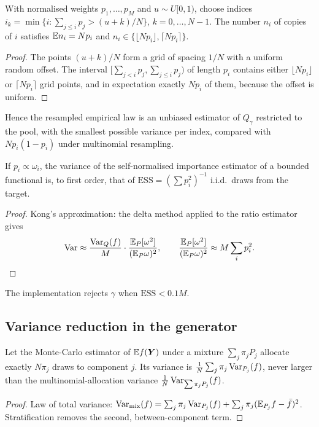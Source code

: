 \begin{proposition}
With normalised weights $p_1,\dots,p_M$ and $u\sim U[0,1)$, choose indices $i_k=\min\{i:\sum_{j\le i}p_j>(u+k)/N\}$, $k=0,\dots,N-1$. The number
$n_i$ of copies of $i$ satisfies $\mathbb{E} n_i=Np_i$ and $n_i\in\{\lfloor Np_i\rfloor,\lceil Np_i\rceil\}$.
\end{proposition}
\begin{proof}
The points $(u+k)/N$ form a grid of spacing $1/N$ with a uniform random offset. The interval $[\sum_{j<i}p_j,\sum_{j\le i}p_j)$ of length $p_i$
contains either $\lfloor Np_i\rfloor$ or $\lceil Np_i\rceil$ grid points, and in expectation exactly $Np_i$ of them, because the offset is uniform.
\end{proof}
Hence the resampled empirical law is an unbiased estimator of $Q_\gamma$ restricted to the pool, with the smallest possible variance per index,
compared with $Np_i(1-p_i)$ under multinomial resampling.

\begin{proposition}
If $p_i\propto\omega_i$, the variance of the self-normalised importance estimator of a bounded functional is, to first order, that of
$\mathrm{ESS}=(\sum p_i^2)^{-1}$ i.i.d.\ draws from the target.
\end{proposition}
\begin{proof}
Kong's approximation: the delta method applied to the ratio estimator gives
\begin{equation*}
  \operatorname{Var}\approx\frac{\operatorname{Var}_{Q}(f)}{M}\cdot\frac{\mathbb{E}_P[\omega^2]}{(\mathbb{E}_P\omega)^2},\qquad \frac{\mathbb{E}_P[\omega^2]}{(\mathbb{E}_P\omega)^2}\approx M\sum_i p_i^2 .
\end{equation*}
\end{proof}
The implementation rejects $\gamma$ when $\mathrm{ESS}<0.1M$.

\subsection{Variance reduction in the generator}

\begin{proposition}
Let the Monte-Carlo estimator of $\mathbb{E} f(\bm Y)$ under a mixture $\sum_j\pi_jP_j$ allocate exactly $N\pi_j$ draws to component $j$. Its variance is
$\frac1N\sum_j\pi_j\operatorname{Var}_{P_j}(f)$, never larger than the multinomial-allocation variance $\frac1N\operatorname{Var}_{\sum\pi_jP_j}(f)$.
\end{proposition}
\begin{proof}
Law of total variance: $\operatorname{Var}_{\text{mix}}(f)=\sum_j\pi_j\operatorname{Var}_{P_j}(f)+\sum_j\pi_j(\mathbb{E}_{P_j}f-\bar f)^2$. Stratification removes the second, between-component term.
\end{proof}

